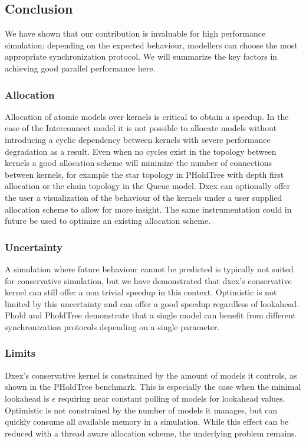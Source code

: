
\subsection{Conclusion}
We have shown that our contribution is invaluable for high performance simulation: depending on the expected behaviour, modellers can choose the most appropriate synchronization protocol.
We will summarize the key factors in achieving good parallel performance here. %
\subsubsection{Allocation}
Allocation of atomic models over kernels is critical to obtain a speedup. 
In the case of the Interconnect model it is not possible to allocate models without introducing a cyclic dependency between kernels with severe performance degradation as a result. 
Even when no cycles exist in the topology between kernels a good allocation scheme will minimize the number of connections between kernels, for example the star topology in PHoldTree with depth first allocation or the chain topology in the Queue model. 
Dxex can optionally offer the user a visualization of the behaviour of the kernels under a user supplied allocation scheme to allow for more insight. 
The same instrumentation could in future be used to optimize an existing allocation scheme.
\subsubsection{Uncertainty}
A simulation where future behaviour cannot be predicted is typically not suited for conservative simulation, but we have demonstrated that dxex's conservative kernel can still offer a non trivial speedup in this context. 
Optimistic is not limited by this uncertainty and can offer a good speedup regardless of lookahead. 
Phold and PholdTree demonstrate that a single model can benefit from different synchronization protocols depending on a single parameter.
\subsubsection{Limits}
Dxex's conservative kernel is constrained by the amount of models it controls, as shown in the PHoldTree benchmark. This is especially the case when the minimal lookahead is $\epsilon$ requiring near constant polling of models for lookahead values. 
Optimistic is not constrained by the number of models it manages, but can quickly consume all available memory in a simulation. While this effect can be reduced with a thread aware allocation scheme, the underlying problem remains.
